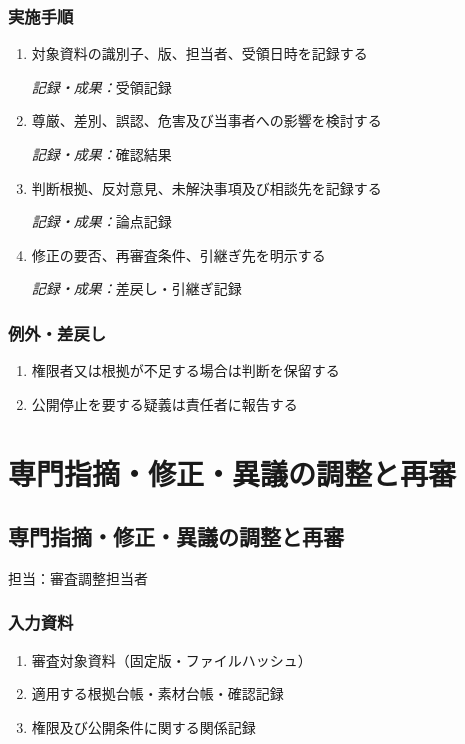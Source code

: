 \documentclass[a4paper,11pt]{article}
\begin{document}
\subsubsection*{実施手順}
\begin{enumerate}[leftmargin=2em,itemsep=0.65em]
\item 対象資料の識別子、版、担当者、受領日時を記録する\par\noindent\textit{記録・成果：}受領記録\nobreak\smallskip
\item 尊厳、差別、誤認、危害及び当事者への影響を検討する\par\noindent\textit{記録・成果：}確認結果\nobreak\smallskip
\item 判断根拠、反対意見、未解決事項及び相談先を記録する\par\noindent\textit{記録・成果：}論点記録\nobreak\smallskip
\item 修正の要否、再審査条件、引継ぎ先を明示する\par\noindent\textit{記録・成果：}差戻し・引継ぎ記録\nobreak\smallskip
\end{enumerate}
\subsubsection*{例外・差戻し}
\begin{enumerate}[leftmargin=2em,itemsep=0.35em]
\item 権限者又は根拠が不足する場合は判断を保留する
\item 公開停止を要する疑義は責任者に報告する
\end{enumerate}
\section{専門指摘・修正・異議の調整と再審}
\subsection{専門指摘・修正・異議の調整と再審}
\par 担当：審査調整担当者\par\medskip
\subsubsection*{入力資料}
\begin{enumerate}[leftmargin=2em,itemsep=0.35em]
\item 審査対象資料（固定版・ファイルハッシュ）
\item 適用する根拠台帳・素材台帳・確認記録
\item 権限及び公開条件に関する関係記録
\end{enumerate}
\end{document}
